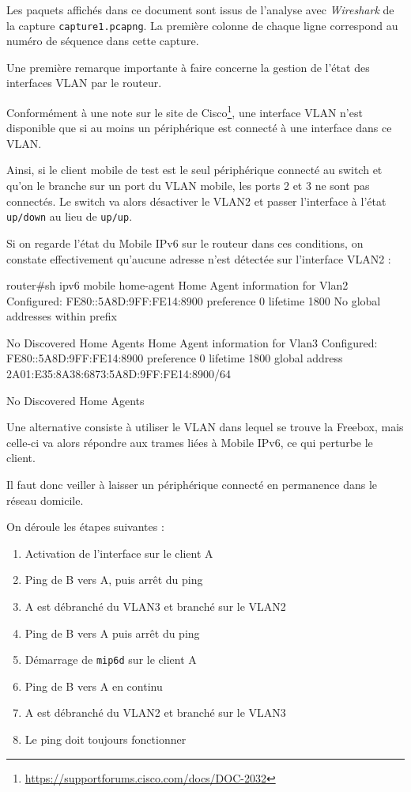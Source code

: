 Les paquets affichés dans ce document sont issus de l'analyse avec \emph{Wireshark} de la capture \texttt{capture1.pcapng}.
La première colonne de chaque ligne correspond au numéro de séquence dans cette capture.

\begin{warning}
Une première remarque importante à faire concerne la gestion de l'état des interfaces VLAN par le routeur.

Conformément à une note sur le site de Cisco\footnote{\url{https://supportforums.cisco.com/docs/DOC-2032}}, une interface VLAN n'est disponible que si au moins un périphérique est connecté à une interface dans ce VLAN.

Ainsi, si le client mobile de test est le seul périphérique connecté au switch et qu'on le branche sur un port du VLAN mobile, les ports 2 et 3 ne sont pas connectés.
Le switch va alors désactiver le VLAN2 et passer l'interface à l'état \texttt{up/down} au lieu de \texttt{up/up}.

Si on regarde l'état du Mobile IPv6 sur le routeur dans ces conditions, on constate effectivement qu'aucune adresse n'est détectée sur l'interface VLAN2 :
\begin{code}
router#sh ipv6 mobile home-agent
Home Agent information for Vlan2
  Configured:
    FE80::5A8D:9FF:FE14:8900
    preference 0 lifetime 1800
      No global addresses within prefix

  No Discovered Home Agents
Home Agent information for Vlan3
  Configured:
    FE80::5A8D:9FF:FE14:8900
    preference 0 lifetime 1800
      global address 2A01:E35:8A38:6873:5A8D:9FF:FE14:8900/64

  No Discovered Home Agents
\end{code}

Une alternative consiste à utiliser le VLAN dans lequel se trouve la Freebox, mais celle-ci va alors répondre aux trames liées à Mobile IPv6, ce qui perturbe le client.

Il faut donc veiller à laisser un périphérique connecté en permanence dans le réseau domicile.
\end{warning}

On déroule les étapes suivantes :

\begin{enumerate}
\item Activation de l'interface sur le client A
\item Ping de B vers A, puis arrêt du ping
\item A est débranché du VLAN3 et branché sur le VLAN2
\item Ping de B vers A puis arrêt du ping
\item Démarrage de \texttt{mip6d} sur le client A
\item Ping de B vers A en continu
\item A est débranché du VLAN2 et branché sur le VLAN3
\item Le ping doit toujours fonctionner
\end{enumerate}

